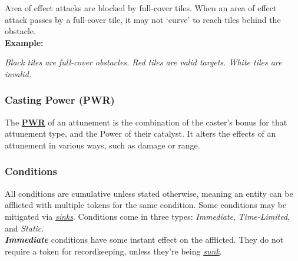 \documentclass[12pt]{article}
\newcommand{\refto}[1]{\hyperlink{#1}{\textbf{#1}}}
\newcommand{\reftoit}[1]{\hyperlink{#1}{\emph{#1}}}
\begin{document}
\begin{multicols*}{2}
\pagebreak

Area of effect attacks are blocked by full-cover tiles. When an area of effect attack passes by a full-cover tile, it may not ‘curve’ to reach tiles behind the obstacle.\\
\textbf{Example:}
\begin{center}
\emph{Black tiles are full-cover obstacles. Red tiles are valid targets. White tiles are invalid.}
\end{center}

\subsubsection{Casting Power (PWR)}
\hypertarget{PWR}{}
The \refto{PWR} of an attunement is the combination of the caster’s bonus for that attunement type, and the Power of their catalyst. It alters the effects of an attunement in various ways, such as damage or range.

\subsubsection{Conditions}
All conditions are cumulative unless stated otherwise, meaning an entity can be afflicted with multiple tokens for the same condition. Some conditions may be mitigated via \reftoit{sinks}. Conditions come in three types: \emph{Immediate}, \emph{Time-Limited}, and \emph{Static.}\\

\emph{\textbf{Immediate}} conditions have some instant effect on the afflicted. They do not require a token for recordkeeping, unless they’re being \reftoit{sunk}.\\


\end{multicols*}
\end{document}

